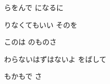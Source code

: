 \documentclass[a4paper,tate,twocolumn,12pt]{ltjtarticle}
\begin{document}
\begin{flushleft}
\begin{minipage}{\linewidth}
らをんで になるに

りなくてもいい そのを

このは のものさ
\end{minipage}

\vspace{2em}

\noindent\begin{minipage}{\linewidth}
わらないはずはないよ をばして
\end{minipage}

\vspace{2em}

\noindent\begin{minipage}{\linewidth}
もかもで さ
\end{minipage}

\end{flushleft}
\end{document}
